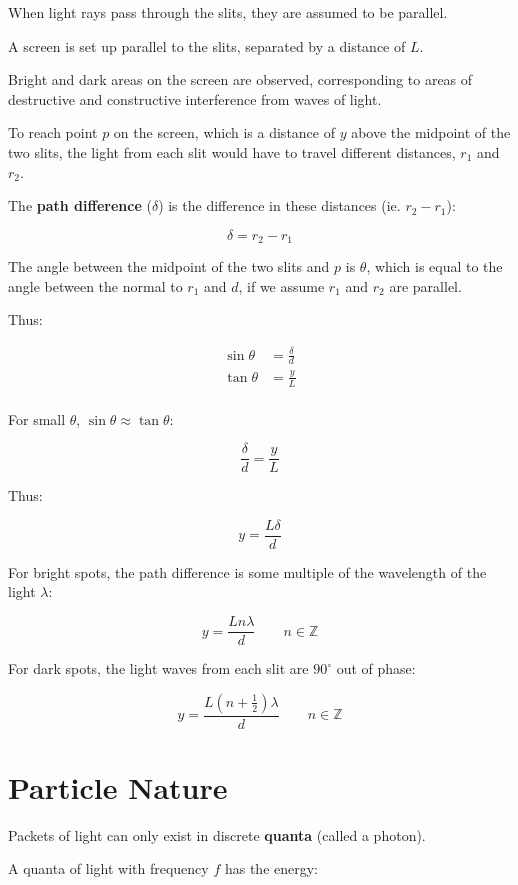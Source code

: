 \documentclass[a4paper,11pt]{report}
\begin{document}
When light rays pass through the slits, they are assumed to be parallel.

A screen is set up parallel to the slits, separated by a distance of $L$.

Bright and dark areas on the screen are observed, corresponding to areas of
destructive and constructive interference from waves of light.

To reach point $p$ on the screen, which is a distance of $y$ above the midpoint
of the two slits, the light from each slit would have to travel different
distances, $r_1$ and $r_2$.

The \textbf{path difference} ($\delta$) is the difference in these distances
(ie. $r_2 - r_1$):

$$
\delta = r_2 - r_1
$$

The angle between the midpoint of the two slits and $p$ is $\theta$, which is
equal to the angle between the normal to $r_1$ and $d$, if we assume $r_1$ and
$r_2$ are parallel.

Thus:

$$
\begin{aligned}
\sin{\theta} & = \frac{\delta}{d} \\
\tan{\theta} & = \frac{y}{L} \\
\end{aligned}
$$

For small $\theta$, $\sin{\theta} \approx \tan{\theta}$:

$$
\frac{\delta}{d} = \frac{y}{L}
$$

Thus:

$$
y = \frac{L\delta}{d}
$$

For bright spots, the path difference is some multiple of the wavelength of the
light $\lambda$:

$$
y = \frac{L n \lambda}{d} \qquad n \in \mathbb{Z}
$$

For dark spots, the light waves from each slit are $90^\circ$ out of phase:

$$
y = \frac{L (n + \frac{1}{2}) \lambda}{d} \qquad n \in \mathbb{Z}
$$


\section{Particle Nature}

Packets of light can only exist in discrete \textbf{quanta} (called a photon).

A quanta of light with frequency $f$ has the energy:
\end{document}
